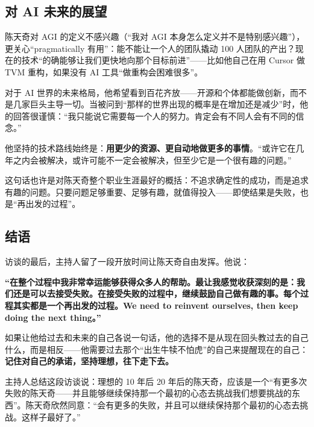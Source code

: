 \documentclass[a4paper]{article}
\begin{document}
\subsection{对 AI 未来的展望}

陈天奇对 AGI 的定义不感兴趣（``我对 AGI 本身怎么定义并不是特别感兴趣''），更关心``pragmatically 有用''：能不能让一个人的团队撬动 100 人团队的产出？现在的技术``的确能够让我们更快地向那个目标前进''------比如他自己在用 Cursor 做 TVM 重构，如果没有 AI 工具``做重构会困难很多''。

对于 AI 世界的未来格局，他希望看到百花齐放------开源和个体都能做创新，而不是几家巨头主导一切。当被问到``那样的世界出现的概率是在增加还是减少''时，他的回答很谨慎：``我只能说它需要每一个人的努力。肯定会有不同人会有不同的信念。''

他坚持的技术路线始终是：\textbf{用更少的资源、更自动地做更多的事情}。``或许它在几年之内会被解决，或许可能不一定会被解决，但至少它是一个很有趣的问题。''

这句话也许是对陈天奇整个职业生涯最好的概括：不追求确定性的成功，而是追求有趣的问题。只要问题足够重要、足够有趣，就值得投入------即使结果是失败，也是``再出发的过程''。

\subsection{结语}

访谈的最后，主持人留了一段开放时间让陈天奇自由发挥。他说：

\textbf{``在整个过程中我非常幸运能够获得众多人的帮助。最让我感觉收获深刻的是：我们还是可以去接受失败。在接受失败的过程中，继续鼓励自己做有趣的事。每个过程其实都是一个再出发的过程。We need to reinvent ourselves, then keep doing the next thing。''}

如果让他给过去和未来的自己各说一句话，他的选择不是从现在回头教过去的自己什么，而是相反------他需要过去那个``出生牛犊不怕虎''的自己来提醒现在的自己：\textbf{记住对自己的承诺，坚持理想，往下走下去。}

主持人总结这段访谈说：理想的 10 年后 20 年后的陈天奇，应该是一个``有更多次失败的陈天奇------并且能够继续保持那一个最初的心态去挑战我们想要挑战的东西''。陈天奇欣然同意：``会有更多的失败，并且可以继续保持那个最初的心态去挑战。这样子最好了。''
\end{document}
